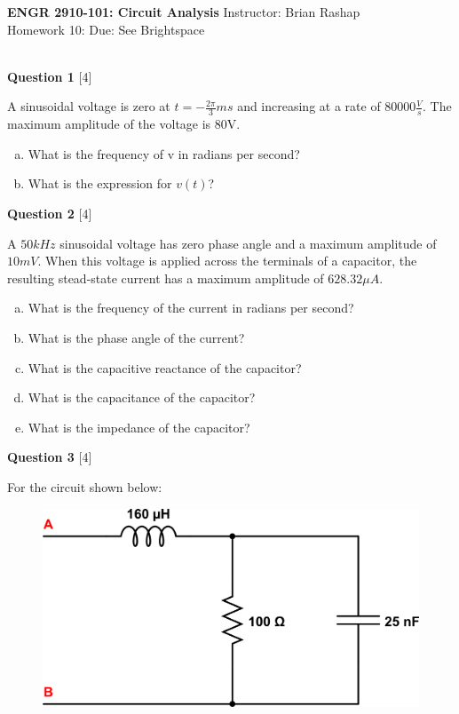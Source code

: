 \documentclass[12pt]{article}
\begin{document}
\begin{center}
\hfil
{\large\bf {ENGR 2910-101: Circuit Analysis}}
\hfill Instructor: Brian Rashap\\
Homework 10: \hfill Due: See Brightspace\\
\hrulefill\\
\end{center}

{\bf Question 1} [4] %

A sinusoidal voltage is zero at $t = -\frac{2 \pi}{3} ms$ and increasing at a rate of $80000 \frac{V}{s}$. The maximum amplitude of the voltage is 80V.

\begin{enumerate}[(a)]
\item What is the frequency of v in radians per second?
\item What is the expression for $v(t)$?
\end{enumerate}

{\bf Question 2} [4] %

A $50 kHz$ sinusoidal voltage has zero phase angle and a maximum amplitude of $10mV$. When this voltage is applied across the terminals of a capacitor, the resulting stead-state current has a maximum amplitude of $628.32 \mu A$.

\begin{enumerate}[(a)]
\item What is the frequency of the current in radians per second?
\item What is the phase angle of the current?
\item What is the capacitive reactance of the capacitor?
\item What is the capacitance of the capacitor?
\item What is the impedance of the capacitor?
\end{enumerate}

{\bf Question 3} [4] %

For the circuit shown below:

\begin{figure}[h!]
\begin{center}
 \includegraphics[scale=0.4]{fig9_27.png}
\end{center}
\end{figure}
\end{document}
